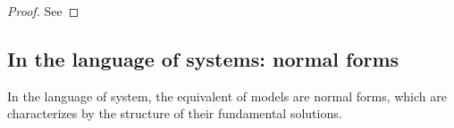 \begin{proof}
  See \TODO{}
\end{proof}
\begin{comment}
  \begin{prop}
    \marginnote{This condition \textbf{might be} equivalent to the
      condition of being \textbf{nice} in~\cite{thboalch}.}
    Let $(\cM,\nabla)$ be a germ, equipped with a basis in which the matrix $A$
    takes the form
    \[
      A=t^{-r}A(t)
    \]
    with
    \begin{itemize}
      \item $r\geq1$,
      \item $A$ has holomorphic entries, and
      \item $A_0:=A(0)$ being regular semisimple, i.e.\ with pairwise distinct
        eigenvalues.
    \end{itemize}
    Then there is no ramification needed, to apply the Levelt-Turittin-theorem.
    \comm{Further, all the summands $\cR_\phi$ have rank one, which is not the
    case in general.}
  \end{prop}
  \begin{proof}
    See~\cite[Thm.II.5.7]{sabbah2007isomonodromic}.
  \end{proof}
\end{comment}

\subsection{In the language of systems: normal forms}
In the language of system, the equivalent of models are normal forms, which are
characterizes by the structure of their fundamental solutions.

